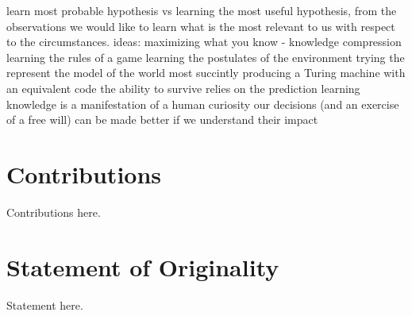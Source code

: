 learn most probable hypothesis vs learning the most useful hypothesis, from the observations we would like to learn what is the most relevant to us with respect to the circumstances.
ideas:
maximizing what you know - knowledge compression
learning the rules of a game
learning the postulates of the environment
trying the represent the model of the world most succintly
producing a Turing machine with an equivalent code
the ability to survive relies on the prediction
learning knowledge is a manifestation of a human curiosity
our decisions (and an exercise of a free will) can be made better if we understand their impact
\subsection{}

\section{Contributions}

Contributions here.


\section{Statement of Originality}

Statement here.